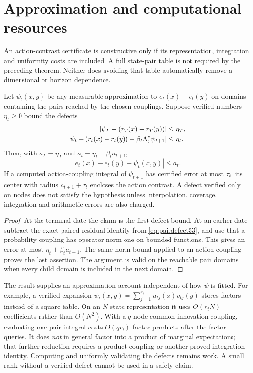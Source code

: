 \section{Approximation and computational resources}\label{sec:resources53}
An action-contrast certificate is constructive only if its representation, integration and uniformity costs are included. A full state-pair table is not required by the preceding theorem. Neither does avoiding that table automatically remove a dimensional or horizon dependence.

\begin{proposition}\label{prop:compressed53}
Let $\psi_t(x,y)$ be any measurable approximation to $e_t(x)-e_t(y)$ on domains containing the pairs reached by the chosen couplings. Suppose verified numbers $\eta_t\ge0$ bound the defects
\begin{align}\label{eq:pairdefect53}
 |\psi_T-(r_T(x)-r_T(y))|&\le\eta_T,\notag\\
 |\psi_t-(r_t(x)-r_t(y))-\beta_t\Lambda_t^\pi\psi_{t+1}|&\le\eta_t.
\end{align}
Then, with $a_T=\eta_T$ and $a_t=\eta_t+\beta_ta_{t+1}$,
\begin{equation}\label{eq:pairerror53}
 |e_t(x)-e_t(y)-\psi_t(x,y)|\le a_t.
\end{equation}
If a computed action-coupling integral of $\psi_{t+1}$ has certified error at most $\tau_t$, its center with radius $a_{t+1}+\tau_t$ encloses the action contrast. A defect verified only on nodes does not satisfy the hypothesis unless interpolation, coverage, integration and arithmetic errors are also charged.
\end{proposition}
\begin{proof}
At the terminal date the claim is the first defect bound. At an earlier date subtract the exact paired residual identity from \eqref{eq:pairdefect53}, and use that a probability coupling has operator norm one on bounded functions. This gives an error at most $\eta_t+\beta_ta_{t+1}$. The same norm bound applied to an action coupling proves the last assertion. The argument is valid on the reachable pair domains when every child domain is included in the next domain.
\end{proof}

The result supplies an approximation account independent of how $\psi$ is fitted. For example, a verified expansion $\psi_t(x,y)=\sum_{j=1}^{r_t}u_{tj}(x)v_{tj}(y)$ stores factors instead of a square table. On an $N$-state representation it uses $O(r_tN)$ coefficients rather than $O(N^2)$. With a $q$-node common-innovation coupling, evaluating one pair integral costs $O(qr_t)$ factor products after the factor queries. It does \emph{not} in general factor into a product of marginal expectations; that further reduction requires a product coupling or another proved integration identity. Computing and uniformly validating the defects remains work. A small rank without a verified defect cannot be used in a safety claim.

